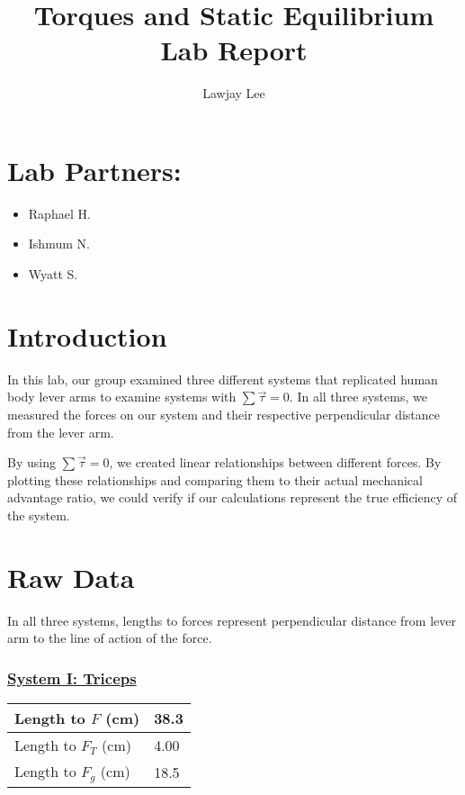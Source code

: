 \documentclass[fleqn]{article}
\title{Torques and Static Equilibrium Lab Report}
\author{Lawjay Lee}
\date{}
\begin{document}
\maketitle

\section*{Lab Partners:}
\begin{itemize}
	\item Raphael H.
	\item Ishmum N.
	\item Wyatt S.
\end{itemize}

\section*{Introduction}
In this lab, our group examined three different systems that replicated human body lever arms to examine systems with $\sum \vec{\tau}=0$. In all three systems, we measured the forces on our system and their respective perpendicular distance from the lever arm.

By using $\sum \vec{\tau} = 0$, we created linear relationships between different forces. By plotting these relationships and comparing them to their actual mechanical advantage ratio, we could verify if our calculations represent the true efficiency of the system.
\section*{Raw Data}
In all three systems, lengths to forces represent perpendicular distance from lever arm to the line of action of the force.

\subsubsection*{\underline{System I: Triceps}}
\begin{table}[H]
	\centering
	\setlength{\extrarowheight}{2pt}
	\begin{tabularx}{\textwidth}{|X|X|}
		\hline
		Length to $F$ (cm)   & 38.3 \\
		\hline
		Length to $F_T$ (cm) & 4.00 \\
		\hline
		Length to $F_g$ (cm) & 18.5 \\
		\hline
	\end{tabularx}
\end{table}
\end{document}
